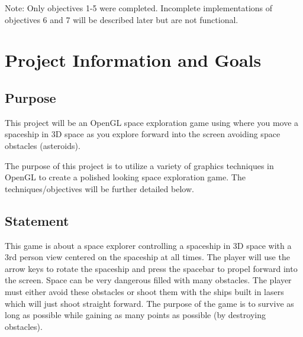\documentclass {article}
\begin{document}
Note: Only objectives 1-5 were completed. Incomplete implementations of objectives 6 and 7 will be described later but are not functional.


\newpage
\section{Project Information and Goals}
\subsection{Purpose}
\hspace{0.5cm}This project will be an OpenGL space exploration game using where you move a spaceship in 3D space as you explore forward into the screen avoiding space obstacles (asteroids).
	
	The purpose of this project is to utilize a variety of graphics techniques in OpenGL to create a polished looking space exploration game.
	The techniques/objectives will be further detailed below.

\subsection{Statement}
	
	\hspace{0.5cm}This game is about a space explorer controlling a spaceship in 3D space with a 3rd person view centered on the spaceship at all times. The player will use the arrow keys to rotate the spaceship and press the spacebar to propel forward into the screen.
	Space can be very dangerous filled with many obstacles. The player must either avoid these obstacles or shoot them with the ships built in lasers which will just shoot straight forward. The purpose of the game is to survive as long as possible while gaining as many points as possible (by destroying obstacles).
	
	
\end{document}
